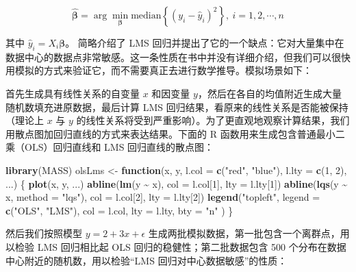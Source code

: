 \documentclass[
  b5paper,
  UTF8,twoside]{book}
\newenvironment{Shaded}{\begin{snugshade}}{\end{snugshade}}
\newcommand{\AttributeTok}[1]{\textcolor[rgb]{0.13,0.29,0.53}{#1}}
\newcommand{\ControlFlowTok}[1]{\textcolor[rgb]{0.13,0.29,0.53}{\textbf{#1}}}
\newcommand{\DecValTok}[1]{\textcolor[rgb]{0.00,0.00,0.81}{#1}}
\newcommand{\FunctionTok}[1]{\textcolor[rgb]{0.13,0.29,0.53}{\textbf{#1}}}
\newcommand{\NormalTok}[1]{#1}
\newcommand{\OtherTok}[1]{\textcolor[rgb]{0.56,0.35,0.01}{#1}}
\newcommand{\SpecialCharTok}[1]{\textcolor[rgb]{0.81,0.36,0.00}{\textbf{#1}}}
\newcommand{\StringTok}[1]{\textcolor[rgb]{0.31,0.60,0.02}{#1}}
\begin{document}
\[\hat{\boldsymbol{\beta}}=\arg\min_{\boldsymbol{\beta}}\text{median}\left\{ (y_{i}-\hat{y}_{i})^{2}\right\} ,\ i=1,2,\cdots,n\]

其中 \(\hat{y}_{i}=X_{i}\boldsymbol{\beta}\)。\citet{Venables02} 简略介绍了 LMS 回归并提出了它的一个缺点：它对大量集中在数据中心的数据点非常敏感。这一条性质在书中并没有详细介绍，但我们可以很快用模拟的方式来验证它，而不需要真正去进行数学推导。模拟场景如下：

首先生成具有线性关系的自变量 \(x\) 和因变量 \(y\)，然后在各自的均值附近生成大量随机数填充进原数据，最后计算 LMS 回归结果，看原来的线性关系是否能被保持（理论上 \(x\) 与 \(y\) 的线性关系将受到严重影响）。为了更直观地观察计算结果，我们用散点图加回归直线的方式来表达结果。下面的 R 函数用来生成包含普通最小二乘（OLS）回归直线和 LMS 回归直线的散点图：

\begin{Shaded}
\begin{Highlighting}[]
\FunctionTok{library}\NormalTok{(MASS)}
\NormalTok{olsLms }\OtherTok{\textless{}{-}} \ControlFlowTok{function}\NormalTok{(x, y, }\AttributeTok{l.col =} \FunctionTok{c}\NormalTok{(}\StringTok{"red"}\NormalTok{, }\StringTok{"blue"}\NormalTok{),}
                   \AttributeTok{l.lty =} \FunctionTok{c}\NormalTok{(}\DecValTok{1}\NormalTok{, }\DecValTok{2}\NormalTok{), ...) \{}
  \FunctionTok{plot}\NormalTok{(x, y, ...)}
  \FunctionTok{abline}\NormalTok{(}\FunctionTok{lm}\NormalTok{(y }\SpecialCharTok{\textasciitilde{}}\NormalTok{ x), }\AttributeTok{col =}\NormalTok{ l.col[}\DecValTok{1}\NormalTok{], }\AttributeTok{lty =}\NormalTok{ l.lty[}\DecValTok{1}\NormalTok{])}
  \FunctionTok{abline}\NormalTok{(}\FunctionTok{lqs}\NormalTok{(y }\SpecialCharTok{\textasciitilde{}}\NormalTok{ x, }\AttributeTok{method =} \StringTok{"lqs"}\NormalTok{), }\AttributeTok{col =}\NormalTok{ l.col[}\DecValTok{2}\NormalTok{], }\AttributeTok{lty =}\NormalTok{ l.lty[}\DecValTok{2}\NormalTok{])}
  \FunctionTok{legend}\NormalTok{(}\StringTok{"topleft"}\NormalTok{,}
    \AttributeTok{legend =} \FunctionTok{c}\NormalTok{(}\StringTok{"OLS"}\NormalTok{, }\StringTok{"LMS"}\NormalTok{), }\AttributeTok{col =}\NormalTok{ l.col,}
    \AttributeTok{lty =}\NormalTok{ l.lty, }\AttributeTok{bty =} \StringTok{"n"}
\NormalTok{  )}
\NormalTok{\}}
\end{Highlighting}
\end{Shaded}

然后我们按照模型 \(y=2+3x+\epsilon\) 生成两批模拟数据，第一批包含一个离群点，用以检验 LMS 回归相比起 OLS 回归的稳健性；第二批数据包含 500 个分布在数据中心附近的随机数，用以检验``LMS 回归对中心数据敏感''的性质：
\end{document}
